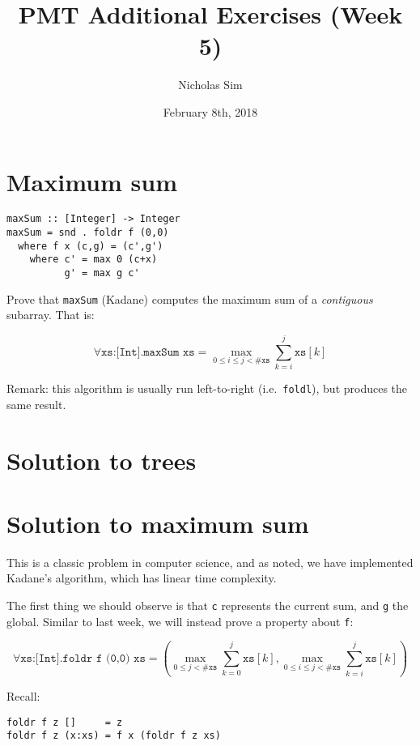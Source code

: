 \documentclass[10pt,a4paper]{article}
\begin{document}
\title{PMT Additional Exercises (Week 5)}
\author{Nicholas Sim}
\date{February 8th, 2018}
\maketitle{}


\section{Maximum sum}

\begin{lstlisting}
maxSum :: [Integer] -> Integer
maxSum = snd . foldr f (0,0)
  where f x (c,g) = (c',g')
    where c' = max 0 (c+x)
          g' = max g c'
\end{lstlisting}

Prove that \texttt{maxSum} (Kadane) computes the maximum sum of a \emph{contiguous} subarray.
That is:

\[ \forall \texttt{xs:[Int].maxSum xs} = \max_{0\le i \le j < \texttt{\#xs}} \sum_{k=i}^{j} \texttt{xs}[k] \]

Remark: this algorithm is usually run left-to-right (i.e.~\texttt{foldl}), but produces the same result.


\newpage

\section{Solution to trees}

\section{Solution to maximum sum}
This is a classic problem in computer science, and as noted,
we have implemented Kadane's algorithm, which has linear time complexity.

The first thing we should observe is that \texttt{c} represents the current sum, and \texttt{g} the global.
Similar to last week, we will instead prove a property about \texttt{f}:

\[ \forall \texttt{xs:[Int].foldr f (0,0) xs} = (\max_{0\le j < \texttt{\#xs}} \sum_{k=0}^{j} \texttt{xs}[k],\max_{0\le i \le j < \texttt{\#xs}} \sum_{k=i}^{j} \texttt{xs}[k]) \]

Recall:

\begin{lstlisting}
foldr f z []     = z
foldr f z (x:xs) = f x (foldr f z xs)
\end{lstlisting}
\end{document}
